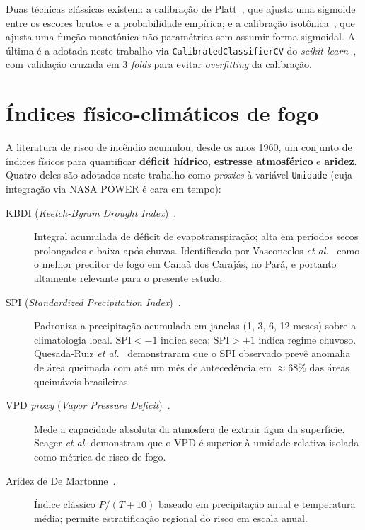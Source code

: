 Duas técnicas clássicas existem: a calibração de Platt~\cite{platt1999probabilistic}, que ajusta uma sigmoide entre os escores brutos e a probabilidade empírica; e a calibração isotônica~\cite{zadrozny2002transforming}, que ajusta uma função monotônica não-paramétrica sem assumir forma sigmoidal. A última é a adotada neste trabalho via \texttt{CalibratedClassifierCV} do \emph{scikit-learn}~\cite{pedregosa2011scikit}, com validação cruzada em 3 \emph{folds} para evitar \emph{overfitting} da calibração.

\section{Índices físico-climáticos de fogo}
\label{sec:fund_indices_fogo}

A literatura de risco de incêndio acumulou, desde os anos 1960, um conjunto de índices físicos para quantificar \textbf{déficit hídrico}, \textbf{estresse atmosférico} e \textbf{aridez}. Quatro deles são adotados neste trabalho como \emph{proxies} à variável \texttt{Umidade} (cuja integração via NASA POWER é cara em tempo):

\begin{description}
  \item[KBDI (\emph{Keetch-Byram Drought Index})~\cite{keetch1968drought}.] Integral acumulada de déficit de evapotranspiração; alta em períodos secos prolongados e baixa após chuvas. Identificado por Vasconcelos \emph{et al.}~\cite{forests2024cerradoamazon} como o melhor preditor de fogo em Canaã dos Carajás, no Pará, e portanto altamente relevante para o presente estudo.

  \item[SPI (\emph{Standardized Precipitation Index})~\cite{mckee1993spi}.] Padroniza a precipitação acumulada em janelas (1, 3, 6, 12 meses) sobre a climatologia local. \(\text{SPI} < -1\) indica seca; \(\text{SPI} > +1\) indica regime chuvoso. Quesada-Ruiz \emph{et al.}~\cite{npjhazards2025fire} demonstraram que o SPI observado prevê anomalia de área queimada com até um mês de antecedência em \(\approx 68\%\) das áreas queimáveis brasileiras.

  \item[VPD \emph{proxy} (\emph{Vapor Pressure Deficit})~\cite{seager2015climatology}.] Mede a capacidade absoluta da atmosfera de extrair água da superfície. Seager \emph{et al.} demonstram que o VPD é superior à umidade relativa isolada como métrica de risco de fogo.

  \item[Aridez de De Martonne~\cite{demartonne1926aridity}.] Índice clássico \(P / (T + 10)\) baseado em precipitação anual e temperatura média; permite estratificação regional do risco em escala anual.
\end{description}


